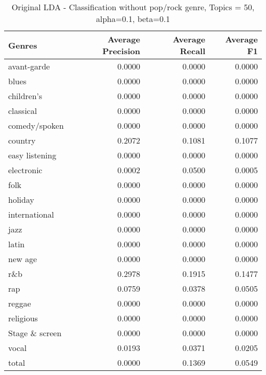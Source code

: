 \begin{table}[h]
\begin{tabular}{|l|r|r|r|}

\hline
\textbf{Genres} &  \textbf{Average Precision} & \textbf{Average Recall} & \textbf{Average F1} \\
\hline
avant-garde & 0.0000	& 0.0000& 	0.0000\\
blues& 0.0000& 	0.0000	& 0.0000\\
children's& 0.0000& 	0.0000	& 0.0000\\
classical& 0.0000& 	0.0000& 	0.0000\\
comedy/spoken& 0.0000& 	0.0000& 	0.0000\\
country& 0.2072& 	0.1081	& 0.1077\\
easy listening& 0.0000& 	0.0000	& 0.0000\\
electronic& 0.0002& 	0.0500& 	0.0005\\
folk& 0.0000& 	0.0000& 	0.0000\\
holiday& 0.0000& 	0.0000& 	0.0000\\
international& 0.0000& 	0.0000& 	0.0000\\
jazz& 0.0000& 	0.0000	& 0.0000\\
latin& 0.0000	& 0.0000& 	0.0000\\
new age& 0.0000& 	0.0000& 	0.0000\\
r\&b& 0.2978	& 0.1915& 	0.1477\\
rap& 0.0759& 	0.0378& 	0.0505\\
reggae& 0.0000& 	0.0000& 0.0000\\
religious& 0.0000	& 0.0000& 	0.0000\\
Stage \& screen& 0.0000	& 0.0000& 	0.0000\\
vocal& 0.0193& 	0.0371& 	0.0205\\
total& 0.0000& 	0.1369& 	0.0549\\
\hline
\end{tabular}
\caption{Original LDA - Classification without pop/rock genre, Topics = 50, alpha=0.1, beta=0.1}
\end{table}